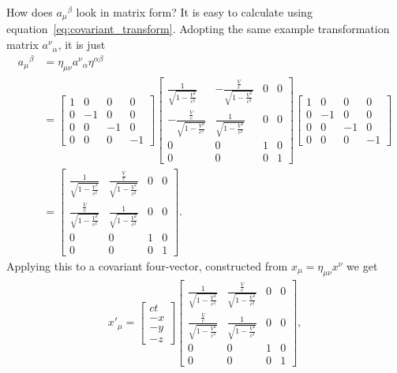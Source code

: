 \documentclass[titlepage,letterpaper,onecolumn,11pt,final]{report}
\numberwithin{equation}{section}
\numberwithin{figure}{section}
\begin{document}
%
How does ${a_{\mu}}^{\beta}$ look in matrix form? It is easy to calculate using equation~\ref{eq:covariant_transform}. Adopting the same example transformation matrix ${a^{\nu}}_{\alpha}$, it is just
\begin{subequations}
\begin{align}
	{a_{\mu}}^{\beta} &= \eta_{\mu \nu} {a^{\nu}}_{\alpha} \eta^{\alpha \beta} \\
	&=
	\begin{bmatrix}
	 1 & 0 & 0 & 0 \\[13pt]
	 0 & -1 & 0 & 0 \\[13pt]
	 0 & 0 & -1 & 0 \\[13pt]
	 0 & 0 & 0 & -1
	\end{bmatrix}
	\begin{bmatrix}
	 \frac{1}{\sqrt{1-\frac{V^2}{c^2}}} & -\frac{\frac{V}{c}}{\sqrt{1-\frac{V^2}{c^2}}} & 0 & 0 \\[10pt]
	 -\frac{\frac{V}{c}}{\sqrt{1-\frac{V^2}{c^2}}} & \frac{1}{\sqrt{1-\frac{V^2}{c^2}}} & 0 & 0 \\[10pt]
	 0 & 0 & 1 & 0 \\[10pt]
	 0 & 0 & 0 & 1
	\end{bmatrix}
	\begin{bmatrix}
	 1 & 0 & 0 & 0 \\[13pt]
	 0 & -1 & 0 & 0 \\[13pt]
	 0 & 0 & -1 & 0 \\[13pt]
	 0 & 0 & 0 & -1
	\end{bmatrix} \\
	&=
	\begin{bmatrix}
	 \frac{1}{\sqrt{1-\frac{V^2}{c^2}}} & \frac{\frac{V}{c}}{\sqrt{1-\frac{V^2}{c^2}}} & 0 & 0 \\[10pt]
	 \frac{\frac{V}{c}}{\sqrt{1-\frac{V^2}{c^2}}} & \frac{1}{\sqrt{1-\frac{V^2}{c^2}}} & 0 & 0 \\[10pt]
	 0 & 0 & 1 & 0 \\[10pt]
	 0 & 0 & 0 & 1
	\end{bmatrix}.
\end{align}
\end{subequations}
%
Applying this to a covariant four-vector, constructed from $x_{\mu} = \eta_{\mu \nu} x^{\nu}$ we get
\begin{gather}
	{x'}_{\mu} =
	\begin{bmatrix}
	 ct \\[13pt]
	 -x \\[13pt]
	 -y \\[13pt]
	 -z 
	\end{bmatrix}
	\begin{bmatrix}
	 \frac{1}{\sqrt{1-\frac{V^2}{c^2}}} & \frac{\frac{V}{c}}{\sqrt{1-\frac{V^2}{c^2}}} & 0 & 0 \\[10pt]
	 \frac{\frac{V}{c}}{\sqrt{1-\frac{V^2}{c^2}}} & \frac{1}{\sqrt{1-\frac{V^2}{c^2}}} & 0 & 0 \\[10pt]
	 0 & 0 & 1 & 0 \\[10pt]
	 0 & 0 & 0 & 1
	\end{bmatrix} ,
\end{gather}
\end{document}
